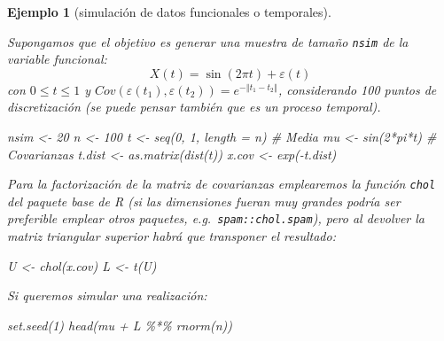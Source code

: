 \documentclass[
]{book}
\newenvironment{Shaded}{\begin{snugshade}}{\end{snugshade}}
\newcommand{\AttributeTok}[1]{\textcolor[rgb]{0.77,0.63,0.00}{#1}}
\newcommand{\CommentTok}[1]{\textcolor[rgb]{0.56,0.35,0.01}{\textit{#1}}}
\newcommand{\DecValTok}[1]{\textcolor[rgb]{0.00,0.00,0.81}{#1}}
\newcommand{\FunctionTok}[1]{\textcolor[rgb]{0.00,0.00,0.00}{#1}}
\newcommand{\NormalTok}[1]{#1}
\newcommand{\OtherTok}[1]{\textcolor[rgb]{0.56,0.35,0.01}{#1}}
\newcommand{\SpecialCharTok}[1]{\textcolor[rgb]{0.00,0.00,0.00}{#1}}
\theoremstyle{break}
\newtheorem{example}{Ejemplo}[chapter]
\theoremstyle{nonumberplain}
\begin{document}
\begin{example}[simulación de datos funcionales o temporales]
\protect\hypertarget{exm:funcional}{}\label{exm:funcional}

Supongamos que el objetivo es generar una muestra de tamaño \texttt{nsim} de la variable funcional:
\[X(t)=\sin\left(  2\pi t\right)  +\varepsilon\left(  t\right)\]
con \(0\leq t \leq1\) y \(Cov(\varepsilon\left( t_1 \right) , \varepsilon\left( t_2 \right) ) = e^{-\left\Vert t_1-t_2 \right\Vert }\),
considerando 100 puntos de discretización (se puede pensar también que es un proceso temporal).

\begin{Shaded}
\begin{Highlighting}[]
\NormalTok{nsim }\OtherTok{\textless{}{-}} \DecValTok{20}
\NormalTok{n }\OtherTok{\textless{}{-}} \DecValTok{100}
\NormalTok{t }\OtherTok{\textless{}{-}} \FunctionTok{seq}\NormalTok{(}\DecValTok{0}\NormalTok{, }\DecValTok{1}\NormalTok{, }\AttributeTok{length =}\NormalTok{ n)}
\CommentTok{\# Media}
\NormalTok{mu }\OtherTok{\textless{}{-}} \FunctionTok{sin}\NormalTok{(}\DecValTok{2}\SpecialCharTok{*}\NormalTok{pi}\SpecialCharTok{*}\NormalTok{t)}
\CommentTok{\# Covarianzas}
\NormalTok{t.dist }\OtherTok{\textless{}{-}} \FunctionTok{as.matrix}\NormalTok{(}\FunctionTok{dist}\NormalTok{(t))}
\NormalTok{x.cov }\OtherTok{\textless{}{-}} \FunctionTok{exp}\NormalTok{(}\SpecialCharTok{{-}}\NormalTok{t.dist)}
\end{Highlighting}
\end{Shaded}

Para la factorización de la matriz de covarianzas emplearemos la función \texttt{chol}
del paquete base de R (si las dimensiones fueran muy grandes podría ser preferible emplear
otros paquetes, e.g.~\texttt{spam::chol.spam}), pero al devolver la matriz triangular superior
habrá que transponer el resultado:

\begin{Shaded}
\begin{Highlighting}[]
\NormalTok{U }\OtherTok{\textless{}{-}} \FunctionTok{chol}\NormalTok{(x.cov)}
\NormalTok{L }\OtherTok{\textless{}{-}} \FunctionTok{t}\NormalTok{(U)}
\end{Highlighting}
\end{Shaded}

Si queremos simular una realización:

\begin{Shaded}
\begin{Highlighting}[]
\FunctionTok{set.seed}\NormalTok{(}\DecValTok{1}\NormalTok{)}
\FunctionTok{head}\NormalTok{(mu }\SpecialCharTok{+}\NormalTok{ L }\SpecialCharTok{\%*\%} \FunctionTok{rnorm}\NormalTok{(n))}
\end{Highlighting}
\end{Shaded}


\end{example}
\end{document}
